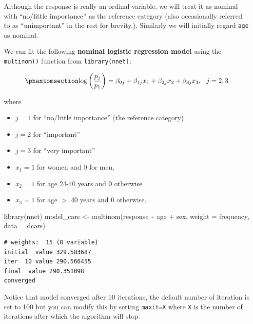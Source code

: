 \documentclass[
  letterpaper,
  DIV=11,
  numbers=noendperiod]{scrartcl}
\newenvironment{Shaded}{\begin{snugshade}}{\end{snugshade}}
\newcommand{\AttributeTok}[1]{\textcolor[rgb]{0.40,0.45,0.13}{#1}}
\newcommand{\FunctionTok}[1]{\textcolor[rgb]{0.28,0.35,0.67}{#1}}
\newcommand{\NormalTok}[1]{\textcolor[rgb]{0.00,0.23,0.31}{#1}}
\newcommand{\OtherTok}[1]{\textcolor[rgb]{0.00,0.23,0.31}{#1}}
\newcommand{\SpecialCharTok}[1]{\textcolor[rgb]{0.37,0.37,0.37}{#1}}
\providecommand{\tightlist}{%
  \setlength{\itemsep}{0pt}\setlength{\parskip}{0pt}}\usepackage{longtable,booktabs,array}
\begin{document}
Although the response is really an ordinal variable, we will treat it as
nominal with ``no/little importance'' as the reference category (also
occasionally referred to as ``unimportant'' in the rest for brevity.).
Similarly we will initially regard \texttt{age} as nominal.

We can fit the following \textbf{nominal logistic regression model}
using the \texttt{multinom()} function from \texttt{library(nnet)}:

\begin{equation}\phantomsection\label{eq-multi_mod}{
\mathrm{log}\left(\frac{p_j}{p_1} \right) = \beta_{0j}+\beta_{1j}x_1+\beta_{2j}x_2+\beta_{3j}x_3, ~~ j=2,3
}\end{equation}

where

\begin{itemize}
\tightlist
\item
  \(j=1\) for ``no/little importance'' (the reference category)
\item
  \(j=2\) for ``important''
\item
  \(j=3\) for ``very important''
\item
  \(x_1=1\) for women and 0 for men,
\item
  \(x_2=1\) for age 24-40 years and 0 otherwise
\item
  \(x_3=1\) for age \(>\) 40 years and 0 otherwise.
\end{itemize}

\begin{Shaded}
\begin{Highlighting}[]
\FunctionTok{library}\NormalTok{(nnet)}
\NormalTok{model\_cars }\OtherTok{\textless{}{-}} \FunctionTok{multinom}\NormalTok{(response }\SpecialCharTok{\textasciitilde{}}\NormalTok{ age }\SpecialCharTok{+}\NormalTok{ sex, }\AttributeTok{weight =}\NormalTok{ frequency, }\AttributeTok{data =}\NormalTok{ dcars)}
\end{Highlighting}
\end{Shaded}

\begin{verbatim}
# weights:  15 (8 variable)
initial  value 329.583687 
iter  10 value 290.566455
final  value 290.351098 
converged
\end{verbatim}

Notice that model converged after 10 iterations, the default number of
iteration is set to 100 but you can modify this by setting
\texttt{maxit=X} where \texttt{X} is the number of iterations after
which the algorithm will stop.
\end{document}
